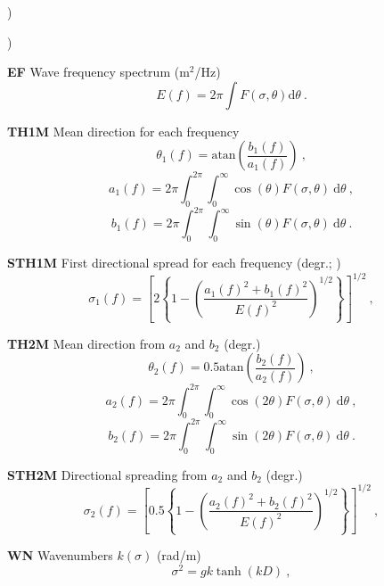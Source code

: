 \begin{list}{)\hfill}
\begin{list}{)\hfill}
\item \textbf{EF} Wave frequency spectrum (m$^2$/Hz)
      \begin{equation} E(f) = 2 \pi  \int F(\sigma,\theta) \mathrm{d} \theta 
      \: . \label{eq:Ef} \end{equation}
\item \textbf{TH1M} Mean direction for each frequency  \citep[degr.;][]{art:KVH88}
       \begin{equation} \theta_1 (f)= \mbox{atan} \left ( \frac{b_1(f)}{a_1(f)} \right )
      \: , \label{eq:theta_b} \end{equation} \begin{equation}
      a_1(f) = 2 \pi \int_0^{2\pi} \int_0^\infty \cos(\theta) F(\sigma,\theta) \:
       \mathrm{d}\theta \: , \end{equation} \begin{equation}
      b_1(f) = 2 \pi \int_0^{2\pi} \int_0^\infty \sin(\theta) F(\sigma,\theta) \:
       \mathrm{d}\theta \: . \end{equation}
\item \textbf{STH1M} First directional spread for each frequency  (degr.; )
      \begin{equation} \sigma_1(f) = \left [ 2 \left \{ 1 - \left (
      \frac{a_1(f)^2+b_1(f)^2}{E(f)^2} \right )^{1/2} \right \} \right ]^{1/2}
      \: , \label{eq:sig_th1} \end{equation}
\item \textbf{TH2M} Mean direction from $a_2$ and $b_2$ (degr.)
       \begin{equation} \theta_2 (f)= 0.5 \mbox{atan} \left ( \frac{b_2(f)}{a_2(f)} \right )
      \: , \label{eq:theta_2} \end{equation} \begin{equation}
      a_2(f) = 2 \pi \int_0^{2\pi} \int_0^\infty \cos(2 \theta) F(\sigma,\theta) \:
       \mathrm{d}\theta \: , \end{equation} \begin{equation}
      b_2(f) = 2 \pi \int_0^{2\pi} \int_0^\infty \sin(2 \theta) F(\sigma,\theta) \:
       \mathrm{d}\theta \: . \end{equation}
\item \textbf{STH2M} Directional spreading from $a_2$ and $b_2$ (degr.)  
      \begin{equation} \sigma_2(f) = \left [ 0.5 \left \{ 1 - \left (
      \frac{a_2(f)^2+b_2(f)^2}{E(f)^2} \right )^{1/2} \right \} \right ]^{1/2}
      \: , \label{eq:sig_th1} \end{equation}
\item \textbf{WN}  Wavenumbers $k(\sigma)$ (rad/m)
      \begin{equation} \sigma^2 = g k \tanh (k D) 
      \: , \label{eq:k} \end{equation}
\end{list}


\end{list}
